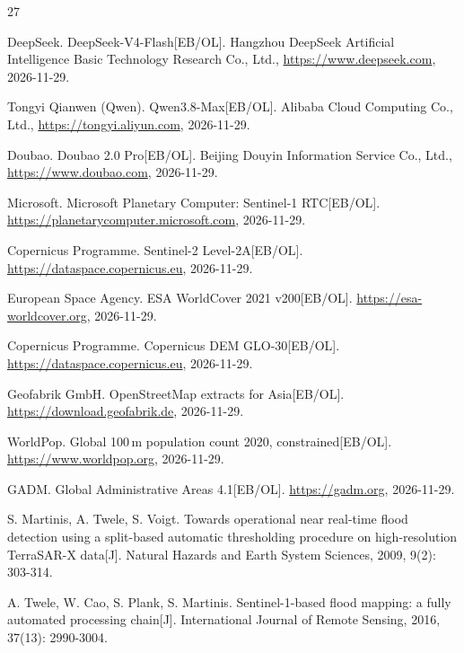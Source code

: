 
\begin{thebibliography}{27}

DeepSeek. DeepSeek-V4-Flash[EB/OL]. Hangzhou DeepSeek Artificial Intelligence Basic Technology Research Co., Ltd., \url{https://www.deepseek.com}, 2026-11-29.

Tongyi Qianwen (Qwen). Qwen3.8-Max[EB/OL]. Alibaba Cloud Computing Co., Ltd., \url{https://tongyi.aliyun.com}, 2026-11-29.

Doubao. Doubao 2.0 Pro[EB/OL]. Beijing Douyin Information Service Co., Ltd., \url{https://www.doubao.com}, 2026-11-29.

Microsoft. Microsoft Planetary Computer: Sentinel-1 RTC[EB/OL]. \url{https://planetarycomputer.microsoft.com}, 2026-11-29.

Copernicus Programme. Sentinel-2 Level-2A[EB/OL]. \url{https://dataspace.copernicus.eu}, 2026-11-29.

European Space Agency. ESA WorldCover 2021 v200[EB/OL]. \url{https://esa-worldcover.org}, 2026-11-29.

Copernicus Programme. Copernicus DEM GLO-30[EB/OL]. \url{https://dataspace.copernicus.eu}, 2026-11-29.

Geofabrik GmbH. OpenStreetMap extracts for Asia[EB/OL]. \url{https://download.geofabrik.de}, 2026-11-29.

WorldPop. Global 100\,m population count 2020, constrained[EB/OL]. \url{https://www.worldpop.org}, 2026-11-29.

GADM. Global Administrative Areas 4.1[EB/OL]. \url{https://gadm.org}, 2026-11-29.

S. Martinis, A. Twele, S. Voigt. Towards operational near real-time flood detection using a split-based automatic thresholding procedure on high-resolution TerraSAR-X data[J]. Natural Hazards and Earth System Sciences, 2009, 9(2): 303-314.

A. Twele, W. Cao, S. Plank, S. Martinis. Sentinel-1-based flood mapping: a fully automated processing chain[J]. International Journal of Remote Sensing, 2016, 37(13): 2990-3004.


\end{thebibliography}
